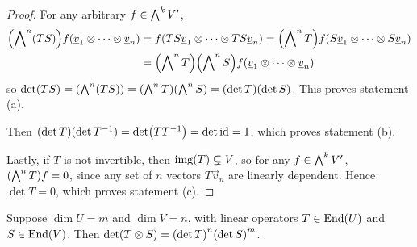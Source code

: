 \begin{proof}
    For any arbitrary \(f \in \operatorname{{\bigwedge}}^k V'\),
    \begin{align*}
        \pqty{\Asym^n (TS)} f(\vec{v}_1 \otimes \cdots \otimes \vec{v}_n)
        &= f(TS\vec{v}_1 \otimes \cdots \otimes TS\vec{v}_n)
        = \pqty{\Asym^n T} f(S\vec{v}_1 \otimes \cdots \otimes S\vec{v}_n) \\
        &= \pqty{\Asym^n T}\pqty{\Asym^n S} f(\vec{v}_1 \otimes \cdots \otimes \vec{v}_n)
    \end{align*}
    so \(\det(TS) = \pqty{\Asym^n (TS)} = \pqty{\Asym^n T}\pqty{\Asym^n S} = (\det T)(\det S)\).
    This proves statement (a).

    Then \((\det T)(\det T^{-1}) = \det(TT^{-1}) = \det\operatorname{id} = 1\),
    which proves statement (b).

    Lastly, if \(T\) is not invertible, then \(\operatorname{img}(T) \subsetneq V\),
    so for any \(f \in \operatorname{{\bigwedge}}^k V'\), \(\pqty{\Asym^n T} f = 0\),
    since any set of \(n\) vectors \(T\vec{v}_n\) are linearly dependent.
    Hence \(\det T = 0\), which proves statement (c).
\end{proof}
\begin{theorem}
    Suppose \(\dim U = m\) and \(\dim V = n\),
    with linear operators \(T \in \operatorname{End}(U)\) and \(S \in \operatorname{End}(V)\).
    Then \(\det(T \otimes S) = \pqty{\det T}^n\pqty{\det S}^m\).
\end{theorem}

